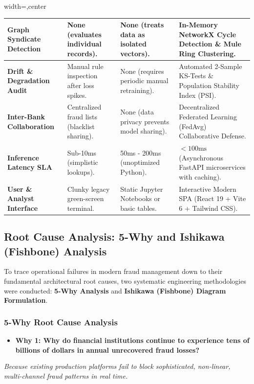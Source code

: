 \documentclass[12pt,a4paper,oneside]{report}
\begin{document}
\begin{table}[H]
\begin{adjustbox}{width=\textwidth,center}
\begin{tabular}{| l | l | l | l |}
\rowcolor{tablealt} \textbf{Graph Syndicate Detection} & None (evaluates individual records). & None (treats data as isolated vectors). & In-Memory NetworkX Cycle Detection \& Mule Ring Clustering. \\ \hline
\textbf{Drift \& Degradation Audit} & Manual rule inspection after loss spikes. & None (requires periodic manual retraining). & Automated 2-Sample KS-Tests \& Population Stability Index (PSI). \\ \hline
\rowcolor{tablealt} \textbf{Inter-Bank Collaboration} & Centralized fraud lists (blacklist sharing). & None (data privacy prevents model sharing). & Decentralized Federated Learning (FedAvg) Collaborative Defense. \\ \hline
\textbf{Inference Latency SLA} & Sub-10ms (simplistic lookups). & 50ms - 200ms (unoptimized Python). & $< 100\text{ms}$ (Asynchronous FastAPI microservices with caching). \\ \hline
\rowcolor{tablealt} \textbf{User \& Analyst Interface} & Clunky legacy green-screen terminal. & Static Jupyter Notebooks or basic tables. & Interactive Modern SPA (React 19 + Vite 6 + Tailwind CSS). \\ \hline
\end{tabular}
\end{adjustbox}
\end{table}


\subsection{Root Cause Analysis: 5-Why and Ishikawa (Fishbone) Analysis}

To trace operational failures in modern fraud management down to their fundamental architectural root causes, two systematic engineering methodologies were conducted: \textbf{5-Why Analysis} and \textbf{Ishikawa (Fishbone) Diagram Formulation}.


\subsubsection{5-Why Root Cause Analysis}

\begin{itemize}[leftmargin=0.35in]
\item \textbf{Why 1: Why do financial institutions continue to experience tens of billions of dollars in annual unrecovered fraud losses?}
\end{itemize}
\textit{Because existing production platforms fail to block sophisticated, non-linear, multi-channel fraud patterns in real time.}
\end{document}
